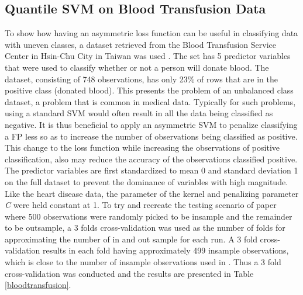 \subsection{Quantile SVM on Blood Transfusion Data}
To show how having an asymmetric loss function can be useful in classifying data with uneven classes, a dataset retrieved from the Blood Transfusion Service Center in Hsin-Chu City in Taiwan was used \citep{Yeh09}. The set has 5 predictor variables that were used to classify whether or not a person will donate blood. The dataset, consisting of 748 observations, has only 23\% of rows that are in the positive class (donated blood). This presents the problem of an unbalanced class dataset, a problem that is common in medical data. Typically for such problems, using a standard SVM would often result in all the data being classified as negative. It is thus beneficial to apply an asymmetric SVM to penalize classifying a FP less so as to increase the number of observations being classified as positive. This change to the loss function while increasing the observations of positive classification, also may reduce the accuracy of the observations classified positive. The predictor variables are first standardized to mean 0 and standard deviation 1 on the full dataset to prevent the dominance of variables with high magnitude. Like the heart disease data, the parameter of the kernel and penalizing parameter \emph{C} were held constant at 1. To try and recreate the testing scenario of \citet{Yeh09} paper where 500 observations were randomly picked to be insample and the remainder to be outsample, a 3 folds cross-validation was used as the number of folds for approximating the number of in and out sample for each run. A 3 fold cross-validation results in each fold having approximately 499 insample observations, which is close to the number of insample observations used in \citet{Yeh09}. Thus a 3 fold cross-validation was conducted and the results are presented in Table \ref{bloodtransfusion}.


